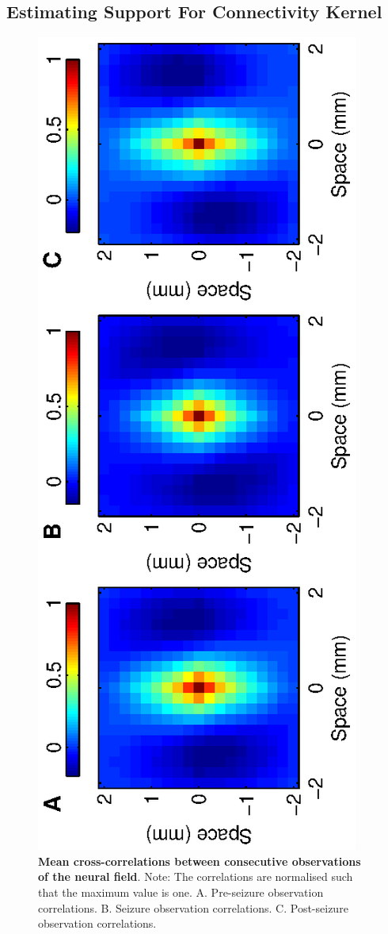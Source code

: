 \documentclass[]{article}
\begin{document}
\subsection{Estimating Support For Connectivity Kernel}
\begin{figure}[!ht]
\begin{center}
\includegraphics{./Figures/CrossCorr2D.eps}
\end{center}
\caption{{\bf Mean cross-correlations between consecutive observations of the neural field}. Note: The correlations are normalised such that the maximum value is one. A. Pre-seizure observation correlations. B. Seizure observation correlations. C. Post-seizure observation correlations.}
\label{fig:SpatialCrossCorrelation}
\end{figure}
\end{document}
